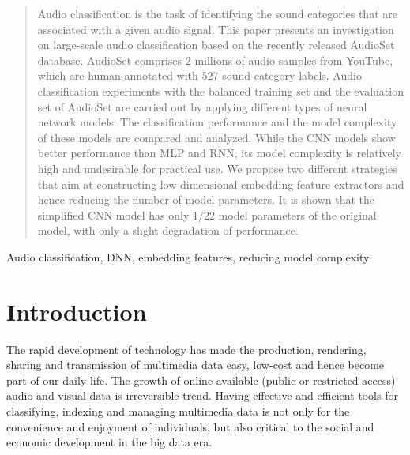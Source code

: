 \documentclass{article}
\begin{document}
\twocolumn
\ninept
%
\maketitle
%
\begin{abstract}
Audio classification is the task of identifying the sound categories that are associated with a given audio signal. This paper presents an investigation on large-scale audio classification based on the recently released AudioSet database. AudioSet comprises $2$ millions of audio samples from YouTube, which are human-annotated with $527$ sound category labels. Audio classification experiments with the balanced training set and the evaluation set of AudioSet are carried out by applying different types of neural network models. The classification performance and the model complexity of these models are compared and analyzed. While the CNN models show better performance than MLP and RNN, its model complexity is relatively high and undesirable for practical use. We propose two different strategies that aim at constructing low-dimensional embedding feature extractors and hence reducing the number of model parameters. It is shown that the simplified CNN model has only $1/22$ model parameters of the original model, with only a slight degradation of performance.
\end{abstract}
%
\begin{keywords}
Audio classification, DNN, embedding features, reducing model complexity
\end{keywords}
%
\section{Introduction}
\label{sec:intro}

The rapid development of technology has made the production, rendering, sharing and transmission of multimedia data easy, low-cost and hence become part of our daily life. The growth of online available (public or restricted-access) audio and visual data is irreversible trend. Having effective and efficient tools for classifying, indexing and managing multimedia data is not only for the convenience and enjoyment of individuals, but also critical to the social and economic development in the big data era.
\end{document}
